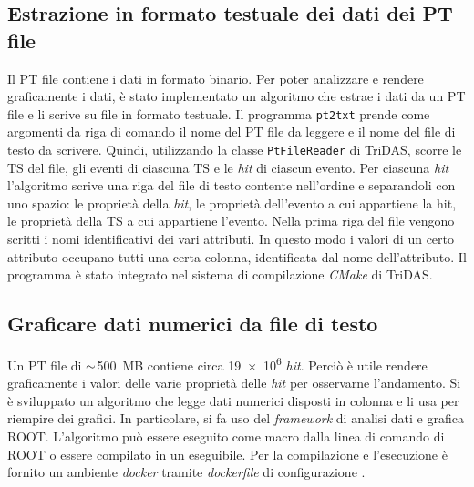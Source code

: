 \documentclass[../main.tex]{subfiles}
\begin{document}
\subsection{Estrazione in formato testuale dei dati dei PT file}
\label{sct:pt2txt}
Il PT file contiene i dati in formato binario. Per poter analizzare e rendere graficamente i dati, è stato implementato un algoritmo che estrae i dati da un PT file e li scrive su file in formato testuale.
Il programma \texttt{pt2txt} prende come argomenti da riga di comando il nome del PT file da leggere e il nome del file di testo da scrivere. 
Quindi, utilizzando la classe \texttt{PtFileReader} di TriDAS, scorre le TS del file, gli eventi di ciascuna TS e le \emph{hit} di ciascun evento. Per ciascuna \emph{hit} l'algoritmo scrive una riga del file di testo contente nell'ordine e separandoli con uno spazio: le proprietà della \emph{hit}, le proprietà dell'evento a cui appartiene la hit, le proprietà della TS a cui appartiene l'evento.
Nella prima riga del file vengono scritti i nomi identificativi dei vari attributi. In questo modo i valori di un certo attributo occupano tutti una certa colonna, identificata dal nome dell'attributo.
Il programma è stato integrato nel sistema di compilazione \emph{CMake} di TriDAS.

%
\subsection{Graficare dati numerici da file di testo}
Un PT file di $\small\sim$\SI{500}{MB} contiene circa \SI{19e6}{} \emph{hit}. Perciò è utile rendere graficamente i valori delle varie proprietà delle \emph{hit} per osservarne l'andamento.
Si è sviluppato un algoritmo che legge dati numerici disposti in colonna e li usa per riempire dei grafici. In particolare, si fa uso del \emph{framework} di analisi dati e grafica ROOT. L'algoritmo può essere eseguito come macro dalla linea di comando di ROOT o essere compilato in un eseguibile. Per la compilazione e l'esecuzione è fornito un ambiente \emph{docker} tramite \emph{dockerfile} di configurazione \autocite{repo_pltxt}.
\end{document}
